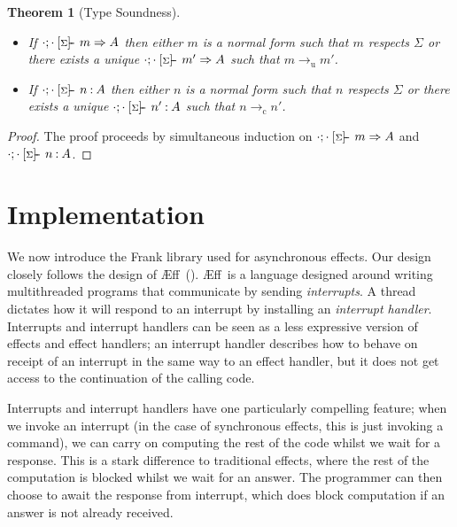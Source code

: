 \documentclass[msc,deptreport,cs]{infthesis} %
\newtheorem{theorem}{Theorem}
\newcommand\aeff{{\AE}ff\xspace}
\newcommand{\sigentails}[1]{\mathbin{[{\text{\scriptsize ${#1}$}}]\hspace{-0.4ex}\text{-\!-}}\,}
\newcommand{\inferbase}[5]{#1; #3 \mathbin{#2} {#4} \Rightarrow {#5}}
\newcommand{\checkbase}[5]{#1; #3 \mathbin{#2} #5 \mathbin{:} #4}
\newcommand{\makes}[5]{\inferbase{#1}{\sigentails{#3}}{#2}{#4}{#5}}
\newcommand{\has}[5]{\checkbase{#1}{\sigentails{#3}}{#2}{#4}{#5}}
\newcommand{\infers}{\makes}
\newcommand{\checks}{\has}
\newcommand{\sigs}{\Sigma}
\newcommand{\nowt}{\emptyset}
\newcommand{\stepstou}{\longrightarrow_{\mathrm{u}}}
\newcommand{\stepstoc}{\longrightarrow_{\mathrm{c}}}
\begin{document}
\begin{theorem}[Type Soundness]\label{thm:soundness}
\begin{itemize}
\\
\item If $\infers{\cdot}{\cdot}{\sigs}{m}{A}$ then either $m$ is a normal form
  such that $m$ respects $\sigs$ or there exists a unique
  $\infers{\cdot}{\cdot}{\sigs}{m'}{A}$ such that $m \stepstou m'$.
\item If $\checks{\cdot}{\cdot}{\sigs}{A}{n}$ then either $n$ is a normal form
  such that $n$ respects $\sigs$ or there exists a unique
  $\checks{\cdot}{\cdot}{\sigs}{A}{n'}$ such that $n \stepstoc n'$.
\end{itemize}
\end{theorem}

\begin{proof}
The proof proceeds by simultaneous induction on
$\infers{\cdot}{\cdot}{\sigs}{m}{A}$ and $\checks{\cdot}{\cdot}{\sigs}{A}{n}$.
\end{proof}


\chapter{Implementation}
\label{chap:Implementation}

We now introduce the Frank library used for asynchronous effects.
%
Our design closely follows the design of \aeff~(\cite{ahman2020asynchronous}).
\aeff~is a language designed around writing multithreaded programs that
communicate by sending \emph{interrupts}. A thread dictates how it will respond
to an interrupt by installing an \emph{interrupt handler}.
%
Interrupts and interrupt handlers can be seen as a less expressive version of
effects and effect handlers; an interrupt handler describes how to behave on
receipt of an interrupt in the same way to an effect handler, but it does not
get access to the continuation of the calling code.

Interrupts and interrupt handlers have one particularly compelling feature; when
we invoke an interrupt (in the case of synchronous effects, this is just
invoking a command), we can carry on computing the rest of the code whilst we
wait for a response. This is a stark difference to traditional effects, where
the rest of the computation is blocked whilst we wait for an answer. The
programmer can then choose to await the response from interrupt, which does
block computation if an answer is not already received.
\end{document}
